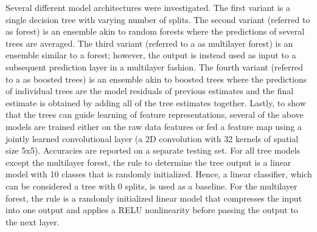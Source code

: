 \documentclass[a4paper,11pt,final]{article}
\begin{document}
Several different model architectures were investigated. The first variant is a single decision tree with varying number of splits. The second variant (referred to as forest) is an ensemble akin to random forests where the predictions of several trees are averaged. The third variant (referred to a as multilayer forest) is an ensemble similar to a forest; however, the output is instead used as input to a subsequent prediction layer in a multilayer fashion. The fourth variant (referred to a as boosted trees) is an ensemble akin to boosted trees where the predictions of individual trees are the model residuals of previous estimates and the final estimate is obtained by adding all of the tree estimates together. Lastly, to show that the trees can guide learning of feature representations, several of the above models are trained either on the raw data features or fed a feature map using a jointly learned convolutional layer (a 2D convolution with 32 kernels of spatial size 5x5). Accuracies are reported on a separate testing set. For all tree models except the multilayer forest, the rule to determine the tree output is a linear model with 10 classes that is randomly initialized. Hence, a linear classifier, which can be considered a tree with 0 splits, is used as a baseline. For the multilayer forest, the rule is a randomly initialized linear model that compresses the input into one output and applies a RELU nonlinearity before passing the output to the next layer.
\end{document}
